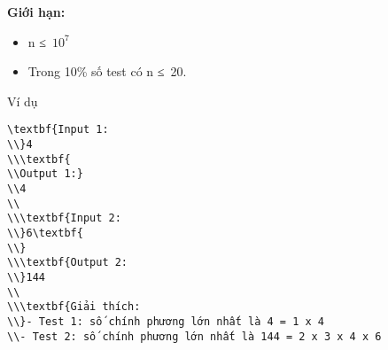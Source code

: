 \textbf{    Giới hạn:   }
\begin{itemize}
	\item     n ≤ $10^{7}$
	\item     Trong 10\% số test có n ≤ 20.   
\end{itemize}
   Ví dụ  
\begin{verbatim}
\textbf{Input 1:
\\}4
\\\textbf{
\\Output 1:}
\\4
\\
\\\textbf{Input 2:
\\}6\textbf{
\\}
\\\textbf{Output 2:
\\}144
\\
\\\textbf{Giải thích:
\\}- Test 1: số chính phương lớn nhất là 4 = 1 x 4
\\- Test 2: số chính phương lớn nhất là 144 = 2 x 3 x 4 x 6\end{verbatim}